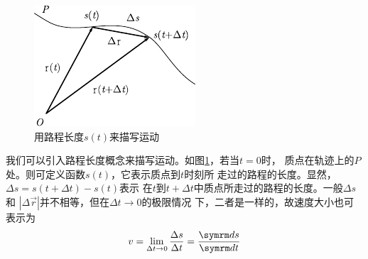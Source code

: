 \setlength{\mathindent}{6em}
\begin{figure}
    \vspace{-6em}
    \centering
    \small
    \includegraphics{figure/fig01.13}
    \caption{用路程长度$s\left(t\right)$来描写运动}
    \label{fig:01.13}
\end{figure}
\noindent 我们可以引入路程长度概念来描写运动。如图\ref{fig:01.13}，若当$t=0$时，
质点在轨迹上的$P$处。则可定义函数$s\left(t\right)$，它表示质点到$t$时刻所
走过的路程的长度。显然，$\Delta s=s\left(t+\Delta t\right)-s\left(t\right)$表示
在$t$到$t+\Delta t$中质点所走过的路程的长度。一般$\Delta s$和
$|\Delta \vec{r}|$并不相等，但在$\Delta t \rightarrow 0$的极限情况
下，二者是一样的，故速度大小也可表示为
\begin{equation}\label{eqn:01.07.05}
    v=\lim_{\Delta t \rightarrow 0}\frac{\Delta s}{\Delta t}=\frac{\dif s}{\dif t}
\end{equation}

